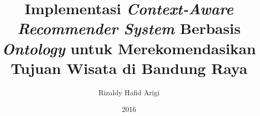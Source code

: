 \documentclass[a4paper,12pt,oneside]{book}
\title{Implementasi \textit{Context-Aware Recommender System} Berbasis \textit{Ontology} untuk Merekomendasikan Tujuan Wisata di Bandung Raya}\let\Title\@title   %
\author{Rizaldy Hafid Arigi}  \let\Author\@author  %
\date{2016}           \let\Date\@date %
\newif\iflogTA
\begin{document}
\begin{titlepage}
\thispagestyle{empty}

\pagebreak
\thispagestyle{empty}

\pagebreak
\end{titlepage}

\iflogTA
\pagebreak
\addcontentsline{toc}{chapter}{Abstract}

\pagebreak
\addcontentsline{toc}{chapter}{Lembar Persembahan}

\pagebreak
\addcontentsline{toc}{chapter}{Kata Pengantar}

\pagebreak
\fi
\cleardoublepage
{}
\tableofcontents
\iflogTA
\newpage
\cleardoublepage
\addcontentsline{toc}{chapter}{Daftar Gambar}
\listoffigures
\newpage
\cleardoublepage
\addcontentsline{toc}{chapter}{Daftar Tabel}
\listoftables
\fi
%
\cleardoublepage
{}

%

%

%

%

%
\cleardoublepage
{}

%
\cleardoublepage
{}

\end{document}
